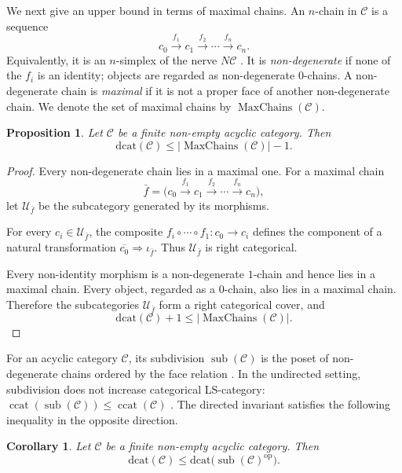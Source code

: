 \documentclass[12pt]{amsart}
\newtheorem{corollary}[teo]{Corollary}
\newtheorem{prop}[teo]{Proposition}
\theoremstyle{definition}
\theoremstyle{remark}
\numberwithin{figure}{section}%
\newcommand{\CC}{\mathcal{C}}
\newcommand{\ccat}{\mathop{\mathrm{ccat}}}
\newcommand{\op}{\mathrm{op}}
\newcommand{\Uc}{\mathcal{U}}
\begin{document}
We next give an upper bound in terms of maximal chains. An \(n\)-chain in
\(\CC\) is a sequence
\[
c_0\xrightarrow{f_1}c_1\xrightarrow{f_2}\cdots
\xrightarrow{f_n}c_n.
\]
Equivalently, it is an \(n\)-simplex of the nerve \(N\CC\)
\cite{nlab:nerve}. It is \emph{non-degenerate} if none of the \(f_i\) is
an identity; objects are regarded as non-degenerate \(0\)-chains. A
non-degenerate chain is \emph{maximal} if it is not a proper face of
another non-degenerate chain. We denote the set of maximal chains by
\(\operatorname{MaxChains}(\CC)\).

\begin{prop}\label{prop:bounds_maxchains}
Let \(\CC\) be a finite non-empty acyclic category. Then
\[
\mathrm{dcat}(\CC)
\leq
|\operatorname{MaxChains}(\CC)|-1.
\]
\end{prop}

\begin{proof}
Every non-degenerate chain lies in a maximal one. For a maximal chain
\[
\bar f=
\bigl(
c_0\xrightarrow{f_1}c_1\xrightarrow{f_2}\cdots
\xrightarrow{f_n}c_n
\bigr),
\]
let \(\Uc_{\bar f}\) be the subcategory generated by its morphisms.

For every \(c_i\in\Uc_{\bar f}\), the composite
\(f_i\circ\cdots\circ f_1\colon c_0\to c_i\) defines the component of a
natural transformation
\(\overline{c_0}\Rightarrow\iota_{\bar f}\). Thus
\(\Uc_{\bar f}\) is right categorical.

Every non-identity morphism is a non-degenerate \(1\)-chain and hence lies
in a maximal chain. Every object, regarded as a \(0\)-chain, also lies in a
maximal chain. Therefore the subcategories \(\Uc_{\bar f}\) form a right
categorical cover, and
\[
\mathrm{dcat}(\CC)+1
\leq
|\operatorname{MaxChains}(\CC)|.
\]
\end{proof}

For an acyclic category \(\CC\), its subdivision
\(\operatorname{sub}(\CC)\) is the poset of non-degenerate chains ordered
by the face relation \cite{Subdivision}. In the undirected setting,
subdivision does not increase categorical LS-category:
\(\ccat(\operatorname{sub}(\CC))\leq\ccat(\CC)\)
\cite[Corollary~3.4 and Proposition~2.19]{LS-Tanaka}. The directed
invariant satisfies the following inequality in the opposite direction.

\begin{corollary}\label{cor:dcat_subdivision}
Let \(\CC\) be a finite non-empty acyclic category. Then
\[
\mathrm{dcat}(\CC)
\leq
\mathrm{dcat}\bigl(\operatorname{sub}(\CC)^{\op}\bigr).
\]
\end{corollary}
\end{document}
